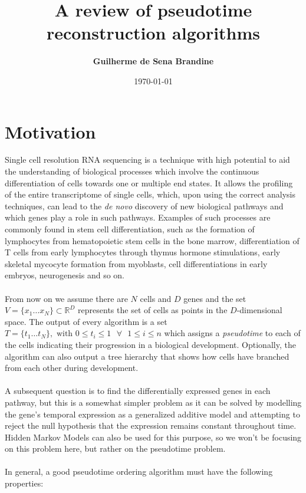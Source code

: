 \documentclass[11pt]{article}
\title{\bf A review of pseudotime reconstruction algorithms}
\author{\bf Guilherme de Sena Brandine}
\date{\today}
\begin{document}
\maketitle

\section{Motivation}
Single cell resolution RNA sequencing is a technique with high potential to aid the understanding of biological processes which involve the continuous differentiation of cells towards one or multiple end states. It allows the profiling of the entire transcriptome of single cells, which, upon using the correct analysis techniques, can lead to the \emph{de novo} discovery of new biological pathways and which genes play a role in such pathways. Examples of such processes are commonly found in stem cell differentiation, such as the formation of lymphocytes from hematopoietic stem cells in the bone marrow, differentiation of T cells from early lymphocytes through thymus hormone stimulations, early skeletal mycocyte formation from myoblasts, cell differentiations in early embryos, neurogenesis and so on.\\
\\
From now on we assume there are $N$ cells and $D$ genes and the set $V = \{x_1 \dots x_N\} \subset \mathbb{R}^D$ represents the set of cells as points in the $D$-dimensional space. The output of every algorithm is a set $T = \{t_1 \dots t_N \}, \mbox{ with } 0 \leq t_i \leq 1 \mbox{ } \forall \mbox{ }1 \leq i \leq n$ which assigns a \emph{pseudotime} to each of the cells indicating their progression in a biological development. Optionally, the algorithm can also output a tree hierarchy that shows how cells have branched from each other during development.\\
\\
A subsequent question is to find the differentially expressed genes in each pathway, but this is a somewhat simpler problem as it can be solved by modelling the gene's temporal expression as a generalized additive model and attempting to reject the null hypothesis that the expression remains constant throughout time. Hidden Markov Models can also be used for this purpose, so we won't be focusing on this problem here, but rather on the pseudotime problem. \\
\\
In general, a good pseudotime ordering algorithm must have the following properties:\\
\end{document}
